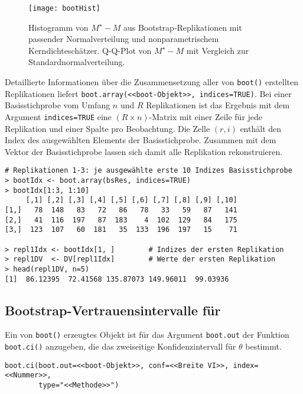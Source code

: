 \begin{figure}[ht]
\centering
\texttt{[image: bootHist]}
\vspace*{-0.5em}
\caption{Histogramm von $M^{\star}-M$ aus Bootstrap-Replikationen mit passender Normalverteilung und nonparametrischem Kerndichteschätzer. Q-Q-Plot von $M^{\star}-M$ mit Vergleich zur Standardnormalverteilung.}
\label{fig:bootHist}
\end{figure}

Detaillierte Informationen über die Zusammensetzung aller von \lstinline!boot()! erstellten Replikationen liefert \lstinline!boot.array(<<boot-Objekt>>, indices=TRUE)!. Bei einer Basisstichprobe vom Umfang $n$ und $R$ Replikationen ist das Ergebnis mit dem Argument \lstinline!indices=TRUE! eine $(R \times  n)$-Matrix mit einer Zeile für jede Replikation und einer Spalte pro Beobachtung. Die Zelle $(r, i)$ enthält den Index des ausgewählten Elements der Basisstichprobe. Zusammen mit dem Vektor der Basisstichprobe lassen sich damit alle Replikation rekonstruieren.
\begin{lstlisting}
# Replikationen 1-3: je ausgewählte erste 10 Indizes Basisstichprobe
> bootIdx <- boot.array(bsRes, indices=TRUE)
> bootIdx[1:3, 1:10]
     [,1] [,2] [,3] [,4] [,5] [,6] [,7] [,8] [,9] [,10]
[1,]   78  148   83   72   86   78   33   59   87   141
[2,]   41  116  197   87  183    4  102  129   84   175
[3,]  123  107   60  181   35  133  196  197   15    71

> repl1Idx <- bootIdx[1, ]        # Indizes der ersten Replikation
> repl1DV  <- DV[repl1Idx]        # Werte der ersten Replikation
> head(repl1DV, n=5)
[1]  86.12395  72.41568 135.87073 149.96011  99.03936
\end{lstlisting}

\subsection[Bootstrap-Vertrauensintervalle für \texorpdfstring{$\mu$}{mu}]{Bootstrap-Vertrauensintervalle für \bm{$\mu$}}
\label{sec:bootMu}

Ein von \lstinline!boot()! erzeugtes Objekt ist für das Argument \lstinline!boot.out! der Funktion \lstinline!boot.ci()! anzugeben, die das zweiseitige Konfidenzintervall für $\theta$ bestimmt.
\begin{lstlisting}
boot.ci(boot.out=<<boot-Objekt>>, conf=<<Breite VI>>, index=<<Nummer>>,
        type="<<Methode>>")
\end{lstlisting}

